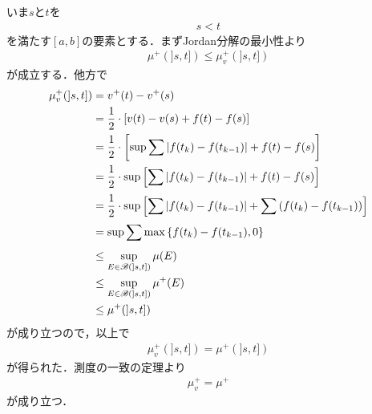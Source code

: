 	いま$s$と$t$を
	\begin{align}
		s < t
	\end{align}
	を満たす$[a,b]$の要素とする．まずJordan分解の最小性より
	\begin{align}
		\mu^{+}(]s,t]) \leq \mu_{v}^{+}(]s,t])
	\end{align}
	が成立する．他方で
	\begin{align}
		\mu_{v}^{+}(]s,t])
		&= v^{+}(t) - v^{+}(s) \\
		&= \frac{1}{2} \cdot [v(t) - v(s) + f(t) - f(s)] \\
		&= \frac{1}{2} \cdot \left[\operatorname*{sup}_{} \sum \left|f(t_k) - f(t_{k-1})\right| + f(t) - f(s)\right] \\
		&= \frac{1}{2} \cdot \operatorname*{sup}_{} \left[\sum \left|f(t_k) - f(t_{k-1})\right| + f(t) - f(s) \right] \\
		&= \frac{1}{2} \cdot \operatorname*{sup}_{} \left[\sum \left|f(t_k) - f(t_{k-1})\right| 
		+ \sum \left(f(t_k) - f(t_{k-1})\right) \right] \\
		&= \operatorname*{sup}_{} \sum \max\left\{f(t_k) - f(t_{k-1}),0\right\} \\
		&\leq \operatorname*{sup}_{E \in \mathscr{B}(]s,t])} \mu(E) \\
		&\leq \operatorname*{sup}_{E \in \mathscr{B}(]s,t])} \mu^{+}(E) \\
		&\leq \mu^{+}(]s,t])
	\end{align}
	が成り立つので，以上で
	\begin{align}
		\mu_{v}^{+}(]s,t]) = \mu^{+}(]s,t])
	\end{align}
	が得られた．測度の一致の定理より
	\begin{align}
		\mu_{v}^{+} = \mu^{+}
	\end{align}
	が成り立つ．